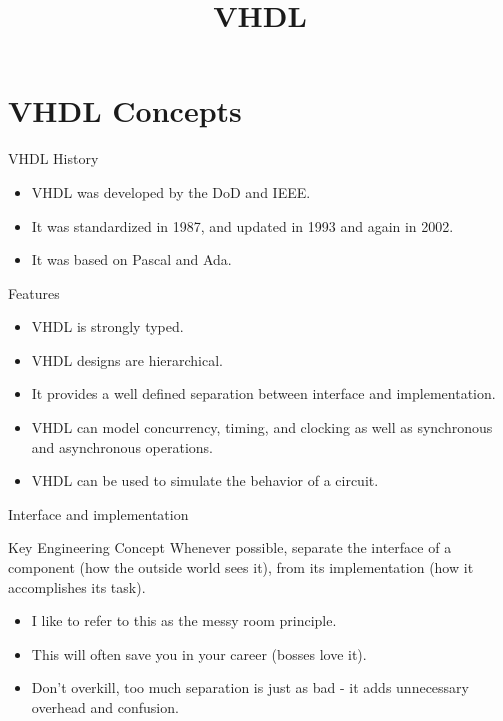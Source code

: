 \title{VHDL}

\section{VHDL Concepts}

\begin{frame}{VHDL History}
  \begin{itemize}
    \item VHDL was developed by the DoD and IEEE.
    \item It was standardized in 1987, and updated in 1993 and again in 2002.
    \item It was based on Pascal and Ada.
  \end{itemize}
\end{frame}

\begin{frame}{Features}
  \begin{itemize}
    \item VHDL is strongly typed.
    \item VHDL designs are hierarchical.
    \item It provides a well defined separation between \alert{interface} and \alert{implementation}.
    \item VHDL can model concurrency, timing, and clocking as well as synchronous and asynchronous operations.
    \item VHDL can be used to simulate the behavior of a circuit.
  \end{itemize}
\end{frame}

\begin{frame}{Interface and implementation}
  \begin{block}{Key Engineering Concept}
    Whenever possible, separate the interface of a component (how the outside world sees it), from its implementation (how it accomplishes its task).
  \end{block}
  \begin{itemize}
     \item I like to refer to this as the messy room principle.
     \item This will often save you in your career (bosses love it).
     \item Don't overkill, too much separation is just as bad - it adds unnecessary overhead and confusion.
  \end{itemize}
\end{frame}

